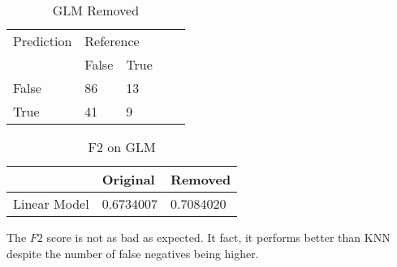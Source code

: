 \begin{table}[!htbp]
\centering
\caption{GLM Removed}
\vspace{0.1cm}
\label{glm-remov}
\begin{tabular}{|l|ll|ll}
\cline{1-3}
Prediction & \multicolumn{2}{l|}{Reference} &  &  \\
           & False          & True          &  &  \\ \cline{2-3}
False      & 86              & 13             &  &  \\
True       & 41              & 9             &  &  \\ \cline{1-3}
\end{tabular}
\end{table}

\begin{table}[!htbp]
\centering
\caption{F2 on GLM}
\vspace{0.1cm}
\label{glm-f2}
\begin{tabular}{|l|l|l|}
\hline
      & Original & Removed \\ \hline
Linear Model & 0.6734007 & 0.7084020       \\ \hline
\end{tabular}
\end{table}


The $F2$ score is not as bad as expected. It fact, it performs better than KNN despite the number of false negatives being higher.








